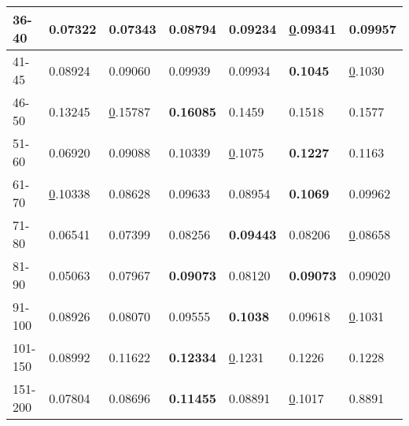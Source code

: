 \begin{table*}[]
\begin{tabular}{|l|l|l|l|l|l|l|}
    36-40     & 0.07322                        & 0.07343                        & 0.08794                        & 0.09234                        & {\ul 0.09341}                  & \textbf{0.09957}               \\ \hline
    41-45     & 0.08924                        & 0.09060                        & 0.09939                        & 0.09934                        & \textbf{0.1045}                & {\ul 0.1030}                   \\ \hline
    46-50     & 0.13245                        & {\ul 0.15787}                  & \textbf{0.16085}               & 0.1459                         & 0.1518                         & 0.1577                         \\ \hline
    51-60     & 0.06920                        & 0.09088                        & 0.10339                        & {\ul 0.1075}                   & \textbf{0.1227}                & 0.1163                         \\ \hline
    61-70     & {\ul 0.10338}                  & 0.08628                        & 0.09633                        & 0.08954                        & \textbf{0.1069}                & 0.09962                        \\ \hline
    71-80     & 0.06541                        & 0.07399                        & 0.08256                        & \textbf{0.09443}               & 0.08206                        & {\ul 0.08658}                  \\ \hline
    81-90     & 0.05063                        & 0.07967                        & \textbf{0.09073}               & 0.08120                        & \textbf{0.09073}               & 0.09020                        \\ \hline
    91-100    & 0.08926                        & 0.08070                        & 0.09555                        & \textbf{0.1038}                & 0.09618                        & {\ul 0.1031}                   \\ \hline
    101-150   & 0.08992                        & 0.11622                        & \textbf{0.12334}               & {\ul 0.1231}                   & 0.1226                         & 0.1228                         \\ \hline
    151-200   & 0.07804                        & 0.08696                        & \textbf{0.11455}               & 0.08891                        & {\ul 0.1017}                   & 0.8891                         \\ \hline

\end{tabular}
\end{table*}
